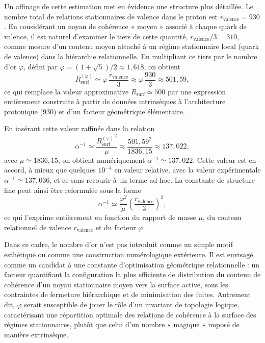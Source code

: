 \documentclass[11pt,a4paper]{article}
\begin{document}
Un affinage de cette estimation met en évidence une structure plus détaillée. Le nombre total de relations stationnaires de valence dans le proton est \(r_{\mathrm{valence}} = 930\). En considérant un noyau de cohérence « moyen » associé à chaque quark de valence, il est naturel d’examiner le tiers de cette quantité, \(r_{\mathrm{valence}}/3 = 310\), comme mesure d’un contenu moyen attaché à un régime stationnaire local (quark de valence) dans la hiérarchie relationnelle. En multipliant ce tiers par le nombre d’or \(\varphi\), défini par \(\varphi = (1+\sqrt{5})/2 \approx 1{,}618\), on obtient
\[
R_{\mathrm{surf}}^{\left(\varphi\right)}
\simeq \varphi \,\frac{r_{\mathrm{valence}}}{3}
\approx \varphi \,\frac{930}{3}
\approx 501{,}59,
\]
ce qui remplace la valeur approximative \(R_{\mathrm{surf}} \simeq 500\) par une expression entièrement construite à partir de données intrinsèques à l’architecture protonique (\(930\)) et d’un facteur géométrique élémentaire.

En insérant cette valeur raffinée dans la relation
\[
\alpha^{-1} \simeq \frac{{R_{\mathrm{surf}}^{\left(\varphi\right)}}^{2}}{\mu}
\approx \frac{501{,}59^{2}}{1836{,}15}
\approx 137{,}022,
\]
avec \(\mu \simeq 1836{,}15\), on obtient numériquement \(\alpha^{-1} \simeq 137{,}022\). Cette valeur est en accord, à mieux que quelques \(10^{-4}\) en valeur relative, avec la valeur expérimentale \(\alpha^{-1} \simeq 137{,}036\), et ce sans recourir à un terme ad hoc. La constante de structure fine peut ainsi être reformulée sous la forme
\[
\alpha^{-1}
\simeq \frac{\varphi^{2}}{\mu}
\left(\frac{r_{\mathrm{valence}}}{3}\right)^{2},
\]
ce qui l’exprime entièrement en fonction du rapport de masse \(\mu\), du contenu relationnel de valence \(r_{\mathrm{valence}}\) et du facteur \(\varphi\).

Dans ce cadre, le nombre d’or n’est pas introduit comme un simple motif esthétique ou comme une construction numérologique extérieure. Il est envisagé comme un candidat à une constante d’optimisation géométrique relationnelle : un facteur quantifiant la configuration la plus efficiente de distribution du contenu de cohérence d’un noyau stationnaire moyen vers la surface active, sous les contraintes de fermeture hiérarchique et de minimisation des fuites. Autrement dit, \(\varphi\) serait susceptible de jouer le rôle d’un invariant de topologie logique, caractérisant une répartition optimale des relations de cohérence à la surface des régimes stationnaires, plutôt que celui d’un nombre « magique » imposé de manière extrinsèque.
\end{document}
